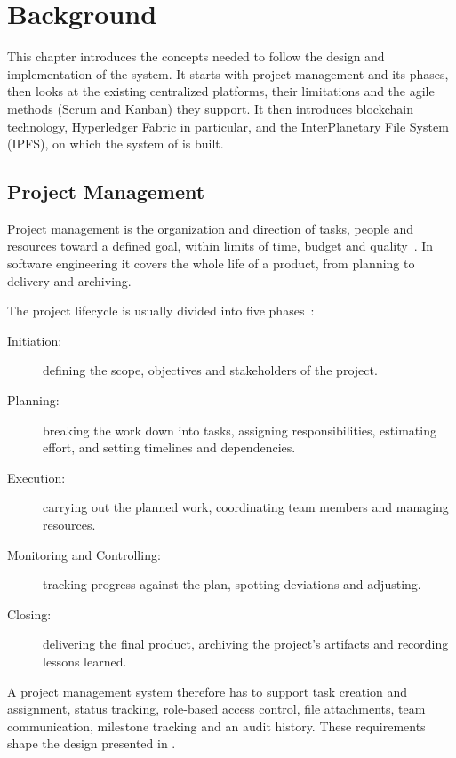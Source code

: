 \chapter{Background}
\label{ch:background}

This chapter introduces the concepts needed to follow the design and implementation of the system. It starts with project management and its phases, then looks at the existing centralized platforms, their limitations and the agile methods (Scrum and Kanban) they support. It then introduces blockchain technology, Hyperledger Fabric in particular, and the InterPlanetary File System (IPFS), on which the system of  is built.

\section{Project Management}
\label{sec:pm}

Project management is the organization and direction of tasks, people and resources toward a defined goal, within limits of time, budget and quality~\cite{pmbok}. In software engineering it covers the whole life of a product, from planning to delivery and archiving.

The project lifecycle is usually divided into five phases~\cite{pmbok}:

\begin{description}
    \item[Initiation:] defining the scope, objectives and stakeholders of the project.
    \item[Planning:] breaking the work down into tasks, assigning responsibilities, estimating effort, and setting timelines and dependencies.
    \item[Execution:] carrying out the planned work, coordinating team members and managing resources.
    \item[Monitoring and Controlling:] tracking progress against the plan, spotting deviations and adjusting.
    \item[Closing:] delivering the final product, archiving the project's artifacts and recording lessons learned.
\end{description}

A project management system therefore has to support task creation and assignment, status tracking, role-based access control, file attachments, team communication, milestone tracking and an audit history. These requirements shape the design presented in .

